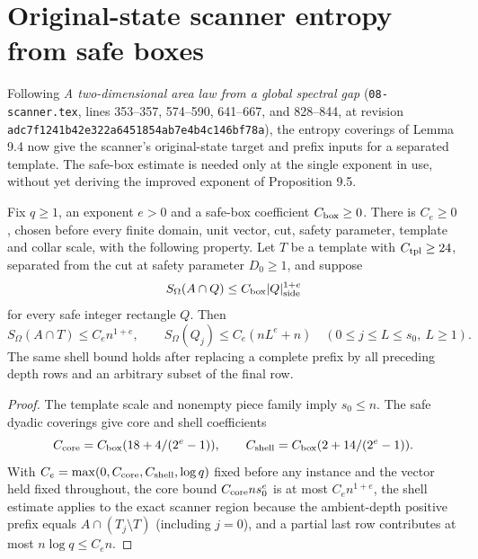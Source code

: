 \section{Original-state scanner entropy from safe boxes}
\label{sec:template-source-entropy}

Following \emph{A two-dimensional area law from a global spectral gap}
(\texttt{08-scanner.tex}, lines 353--357, 574--590, 641--667, and 828--844,
at revision \texttt{adc7f1241b42e322a6451854ab7e4b4c146bf78a}), the entropy
coverings of Lemma 9.4 now give the scanner's original-state
target and prefix inputs for a separated template.  The safe-box
estimate is needed only at the single exponent in use, without yet deriving
the improved exponent of Proposition 9.5.

\begin{lemma}
    \label{thm:template-source-entropy}
    \leanok
    Fix $q\geq1$, an exponent $e>0$ and a safe-box coefficient $C_{\rm box}\geq0$.
    There is $C_e\geq0$, chosen before every finite domain, unit vector,
    cut, safety parameter, template and collar scale, with the following
    property.  Let $T$ be a template with $C_{\rm tpl}\geq24$,
    separated from the cut at safety parameter $D_0\geq1$, and suppose
    \[
        S_\Omega(A\cap Q)\leq C_{\rm box}|Q|_{\rm side}^{1+e}
    \]
    for every safe integer rectangle $Q$.  Then
    \[
        S_\Omega(A\cap T)\leq C_e n^{1+e},\qquad
        S_\Omega(Q_j)\leq C_e(nL^e+n)
        \quad(0\leq j\leq L\leq s_0,\ L\geq1).
    \]
    The same shell bound holds after replacing a complete prefix by all
    preceding depth rows and an arbitrary subset of the final row.
\end{lemma}

\begin{proof}
    \leanok
    The template scale and nonempty piece family imply $s_0\leq n$.
    The safe dyadic coverings give core and shell coefficients
    \[
        C_{\rm core}=C_{\rm box}(18+4/(2^e-1)),\qquad
        C_{\rm shell}=C_{\rm box}(2+14/(2^e-1)).
    \]
    With $C_e=\max(0,C_{\rm core},C_{\rm shell},\log q)$ fixed before any
    instance and the vector held fixed throughout, the core bound
    $C_{\rm core}ns_0^e$ is at most $C_e n^{1+e}$, the shell estimate
    applies to the exact scanner region because the ambient-depth positive
    prefix equals $A\cap(T_j\setminus T)$ (including $j=0$), and a partial
    last row contributes at most $n\log q\leq C_en$.
\end{proof}

